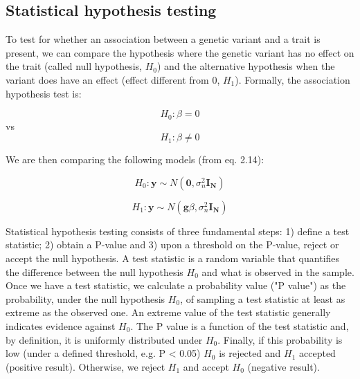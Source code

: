 
\newpage

\subsection{Statistical hypothesis testing}

To test for whether an association between a genetic variant and a trait is present, we can compare the hypothesis where the genetic variant has no effect on the trait (called null hypothesis, $H_0$) and the alternative hypothesis when the variant does have an effect (effect different from 0, $H_1$).
Formally, the association hypothesis test is:

\begin{equation}\label{eq14:null_hypothesis}
 H_{0}: \beta=0 
\end{equation}
vs
\begin{equation}\label{eq15:alternative_hypothesis}
 H_{1}: \beta \neq 0 
\end{equation}

We are then comparing the following models (from eq. 2.14):

\begin{equation}\label{eq16:null_hypothesis_regression}
 H_0: \mathbf{y} \sim N(\mathbf{0}, \sigma_n^{2} \mathbf{I_N}) 
\end{equation}

\begin{equation}\label{eq17:alternative_hypothesis_regression}
 H_1: \mathbf{y} \sim N(\mathbf{g}\beta,\sigma_n^{2} \mathbf{I_N}) 
\end{equation}

Statistical hypothesis testing consists of three fundamental steps: 1) define a test statistic; 2) obtain a P-value and 3) upon a threshold on the P-value, reject or accept the null hypothesis. 
A test statistic is a random variable that quantifies the difference between the null hypothesis $H_0$ and what is observed in the sample. 
Once we have a test statistic, we calculate a probability value ("P value") as the probability, under the null hypothesis $H_0$, of sampling a test statistic at least as extreme as the observed one. 
An extreme value of the test statistic generally indicates evidence against $H_0$.
The P value is a function of the test statistic and, by definition, it is uniformly distributed under $H_0$.
Finally, if this probability is low (under a defined threshold, e.g. P < 0.05) $H_0$ is rejected and $H_1$ accepted (positive result).
Otherwise, we reject $H_1$ and accept $H_0$ (negative result).\\

